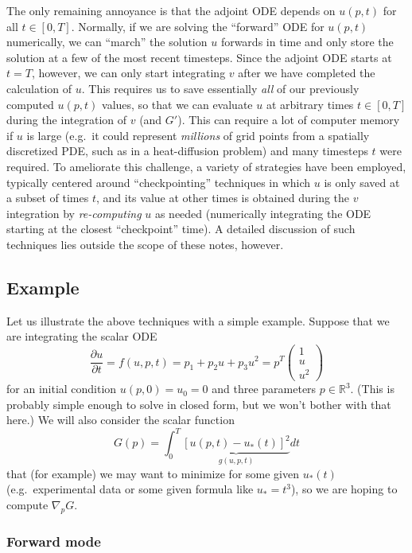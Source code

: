 The only remaining annoyance is that the adjoint ODE depends on $u(p,t)$
for all $t\in[0,T]$. Normally, if we are solving the ``forward''
ODE for $u(p,t)$ numerically, we can ``march'' the solution $u$
forwards in time and only store the solution at a few of the most
recent timesteps. Since the adjoint ODE starts at $t=T$, however,
we can only start integrating $v$ after we have completed the calculation
of $u$. This requires us to save essentially \emph{all} of our previously
computed $u(p,t)$ values, so that we can evaluate $u$ at arbitrary
times $t\in[0,T]$ during the integration of $v$ (and $G'$). This
can require a lot of computer memory if $u$ is large (e.g.~it could
represent \emph{millions} of grid points from a spatially discretized
PDE, such as in a heat-diffusion problem) and many timesteps $t$
were required. To ameliorate this challenge, a variety of strategies
have been employed, typically centered around ``checkpointing''
techniques in which $u$ is only saved at a subset of times $t$,
and its value at other times is obtained during the $v$ integration
by \emph{re-computing} $u$ as needed (numerically integrating the
ODE starting at the closest ``checkpoint'' time). A detailed discussion
of such techniques lies outside the scope of these notes, however.

\subsection{Example}

Let us illustrate the above techniques with a simple example. Suppose
that we are integrating the scalar ODE 
\[
\frac{\partial u}{\partial t}=f(u,p,t)=p_{1}+p_{2}u+p_{3}u^{2}=p^{T}\left(\begin{array}{c}
1\\
u\\
u^{2}
\end{array}\right)
\]
for an initial condition $u(p,0)=u_{0}=0$ and three parameters $p \in \mathbb{R}^3$. (This is probably simple
enough to solve in closed form, but we won't bother with that here.) We will also consider the scalar function 
\[
G(p)=\int_{0}^{T}\underbrace{\left[u(p,t)-u_{*}(t)\right]^{2}}_{g(u,p,t)}dt
\]
that (for example) we may want to minimize for some given $u_{*}(t)$ (e.g.~experimental
data or some given formula like $u_{*}=t^{3}$), so we are hoping to compute $\nabla_{p}G$.

\subsubsection{Forward mode}

